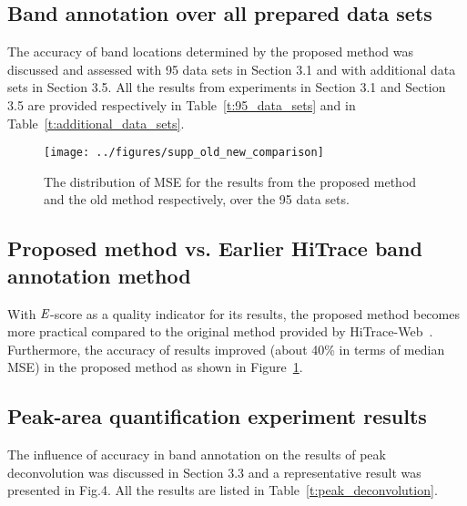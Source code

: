 \documentclass[letter]{bioinfo}
\newcommand{\escore}{{\emph{E}}}
\begin{document}
\subsection{ Band annotation over all prepared data sets }
The accuracy of band locations determined by the proposed method was discussed and assessed with 95 data sets in Section 3.1 and with additional data sets in Section 3.5. All the results from experiments in Section 3.1 and Section 3.5 are provided respectively in Table~\ref{t:95_data_sets} and in Table~\ref{t:additional_data_sets}.



\begin{figure}
\centering
\texttt{[image: ../figures/supp\_old\_new\_comparison]}
\caption{The distribution of MSE for the results from the proposed method and the old method respectively, over the 95 data sets.}
\label{f:old_vs_new}
\end{figure}


\subsection{ Proposed method vs. Earlier HiTrace band annotation method }
With $\escore$-score as a quality indicator for its results, the proposed method becomes more practical compared to the original method provided by HiTrace-Web~\citep{Kim2013}. Furthermore, the accuracy of results improved (about 40\% in terms of median MSE) in the proposed method as shown in Figure~\ref{f:old_vs_new}.


\subsection{ Peak-area quantification experiment results }
The influence of accuracy in band annotation on the results of peak deconvolution was discussed in Section 3.3 and a representative result was presented in Fig.4. All the results are listed in Table~\ref{t:peak_deconvolution}.





\onecolumn

\end{document}
